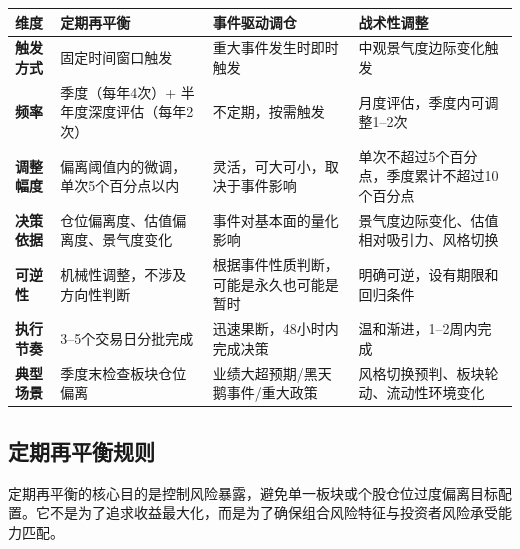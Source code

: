 \begin{exhibitbox}[表9-13：三种再平衡类型对比]
\scriptsize
\setlength{\tabcolsep}{3pt}
\renewcommand{\arraystretch}{1.15}
\begin{tabularx}{\textwidth}{l X X X}
\toprule
\textbf{维度} & \textbf{定期再平衡} & \textbf{事件驱动调仓} & \textbf{战术性调整} \\
\midrule
\textbf{触发方式} & 固定时间窗口触发 & 重大事件发生时即时触发 & 中观景气度边际变化触发 \\
\textbf{频率} & 季度（每年4次）+ 半年度深度评估（每年2次） & 不定期，按需触发 & 月度评估，季度内可调整1--2次 \\
\textbf{调整幅度} & 偏离阈值内的微调，单次5个百分点以内 & 灵活，可大可小，取决于事件影响 & 单次不超过5个百分点，季度累计不超过10个百分点 \\
\textbf{决策依据} & 仓位偏离度、估值偏离度、景气度变化 & 事件对基本面的量化影响 & 景气度边际变化、估值相对吸引力、风格切换 \\
\textbf{可逆性} & 机械性调整，不涉及方向性判断 & 根据事件性质判断，可能是永久也可能是暂时 & 明确可逆，设有期限和回归条件 \\
\textbf{执行节奏} & 3--5个交易日分批完成 & 迅速果断，48小时内完成决策 & 温和渐进，1--2周内完成 \\
\textbf{典型场景} & 季度末检查板块仓位偏离 & 业绩大超预期/黑天鹅事件/重大政策 & 风格切换预判、板块轮动、流动性环境变化 \\
\bottomrule
\end{tabularx}
\end{exhibitbox}

\subsection{定期再平衡规则}

定期再平衡的核心目的是控制风险暴露，避免单一板块或个股仓位过度偏离目标配置。它不是为了追求收益最大化，而是为了确保组合风险特征与投资者风险承受能力匹配。


